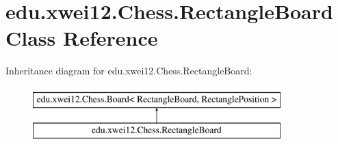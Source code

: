 \hypertarget{classedu_1_1xwei12_1_1_chess_1_1_rectangle_board}{}\section{edu.\+xwei12.\+Chess.\+Rectangle\+Board Class Reference}
\label{classedu_1_1xwei12_1_1_chess_1_1_rectangle_board}
Inheritance diagram for edu.\+xwei12.\+Chess.\+Rectangle\+Board\+:\begin{figure}[H]
\begin{center}
\leavevmode
\includegraphics[height=2.000000cm]{classedu_1_1xwei12_1_1_chess_1_1_rectangle_board}
\end{center}
\end{figure}
